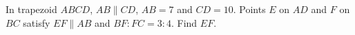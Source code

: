 In trapezoid $ABCD$, $AB\parallel CD$, $AB=7$ and $CD=10$. Points $E$ on $AD$ and $F$ on $BC$ satisfy $EF\parallel AB$ and $BF:FC=3:4$. Find $EF$.

